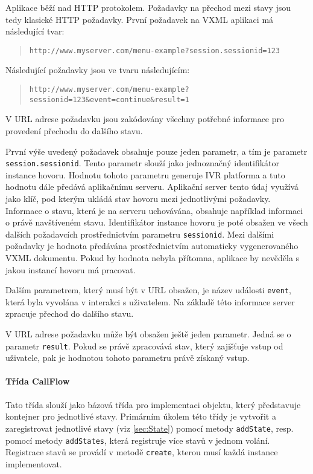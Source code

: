 \documentclass[ing,male,java,dept460]{diploma}						%
\begin{document}
Aplikace běží nad HTTP protokolem. Požadavky na přechod mezi stavy jsou tedy klasické HTTP požadavky. První požadavek na VXML aplikaci má následující tvar:

\begin{quote}
\begin{sloppypar}
	\texttt{http://www.myserver.com/menu-example?session.sessionid=123}
\end{sloppypar}
\end{quote}

Následující požadavky jsou ve tvaru následujícím:

\begin{quote}
\begin{sloppypar}
	\texttt{http://www.myserver.com/menu-example?sessionid=123\allowbreak\&event=continue\&result=1}
\end{sloppypar}
\end{quote}

V URL adrese požadavku jsou zakódovány všechny potřebné informace pro provedení přechodu do dalšího stavu.

První výše uvedený požadavek obsahuje pouze jeden parametr, a tím je parametr \texttt{session.sessionid}. Tento parametr slouží jako jednoznačný identifikátor instance hovoru. Hodnotu tohoto parametru generuje IVR platforma a tuto hodnotu dále předává aplikačnímu serveru. Aplikační server tento údaj využívá jako klíč, pod kterým ukládá stav hovoru mezi jednotlivými požadavky. Informace o stavu, která je na serveru uchovávána, obsahuje například informaci o právě navštíveném stavu. Identifikátor instance hovoru je poté obsažen ve všech dalších požadavcích prostřednictvím parametru \texttt{sessionid}. Mezi dalšími požadavky je hodnota předávána prostřednictvím automaticky vygenerovaného VXML dokumentu. Pokud by hodnota nebyla přítomna, aplikace by nevěděla s jakou instancí hovoru má pracovat.

Dalším parametrem, který musí být v URL obsažen, je název události \texttt{event}, která byla vyvolána v interakci s uživatelem. Na základě této informace server zpracuje přechod do dalšího stavu.

V URL adrese požadavku může být obsažen ještě jeden parametr. Jedná se o parametr \texttt{result}. Pokud se právě zpracovává stav, který zajišťuje vstup od uživatele, pak je hodnotou tohoto parametru právě získaný vstup.

\paragraph{Třída CallFlow}
\label{sec:CallFlow}
Tato třída slouží jako bázová třída pro implementaci objektu, který představuje kontejner pro jednotlivé stavy. Primárním úkolem této třídy je vytvořit a zaregistrovat jednotlivé stavy (viz \ref{sec:State}) pomocí metody \texttt{addState}, resp. pomocí metody \texttt{addStates}, která registruje více stavů v jednom volání. Registrace stavů se provádí v metodě \texttt{create}, kterou musí každá instance implementovat.
\end{document}
